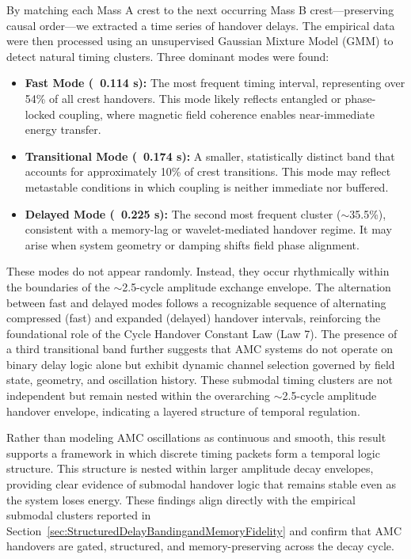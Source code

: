 \documentclass[10pt,aps,pre,onecolumn,superscriptaddress,notitlepage]{revtex4-2}
\begin{document}
By matching each Mass A crest to the next occurring Mass B crest—preserving causal order—we extracted a time series of handover delays. The empirical data were then processed using an unsupervised Gaussian Mixture Model (GMM) to detect natural timing clusters. Three dominant modes were found:

\begin{itemize}
    \item \textbf{Fast Mode (~0.114 s):} The most frequent timing interval, representing over 54\% of all crest handovers. This mode likely reflects entangled or phase-locked coupling, where magnetic field coherence enables near-immediate energy transfer.
    \item \textbf{Transitional Mode (~0.174 s):} A smaller, statistically distinct band that accounts for approximately 10\% of crest transitions. This mode may reflect metastable conditions in which coupling is neither immediate nor buffered.
    \item \textbf{Delayed Mode (~0.225 s):} The second most frequent cluster ($\sim$35.5\%), consistent with a memory-lag or wavelet-mediated handover regime. It may arise when system geometry or damping shifts field phase alignment.
\end{itemize}

These modes do not appear randomly. Instead, they occur rhythmically within the boundaries of the $\sim$2.5-cycle amplitude exchange envelope. The alternation between fast and delayed modes follows a recognizable sequence of alternating compressed (fast) and expanded (delayed) handover intervals, reinforcing the foundational role of the Cycle Handover Constant Law (Law 7). The presence of a third transitional band further suggests that AMC systems do not operate on binary delay logic alone but exhibit dynamic channel selection governed by field state, geometry, and oscillation history. These submodal timing clusters are not independent but remain nested within the overarching $\sim$2.5-cycle amplitude handover envelope, indicating a layered structure of temporal regulation.

Rather than modeling AMC oscillations as continuous and smooth, this result supports a framework in which discrete timing packets form a temporal logic structure. This structure is nested within larger amplitude decay envelopes, providing clear evidence of submodal handover logic that remains stable even as the system loses energy.
These findings align directly with the empirical submodal clusters reported in Section~\ref{sec:StructuredDelayBandingandMemoryFidelity} and confirm that AMC handovers are gated, structured, and memory-preserving across the decay cycle. 
\end{document}
